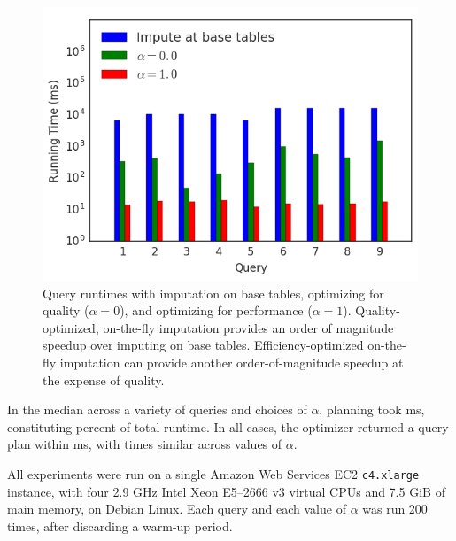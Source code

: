 \begin{figure}
\includegraphics[width=\columnwidth]{figures/running_times_combined_bar.png}
\caption{Query runtimes with imputation on base tables, \ProjectName{}
    optimizing for quality ($\alpha=0$), and \ProjectName{} optimizing for
    performance ($\alpha=1$). Quality-optimized, on-the-fly imputation provides an order of
    magnitude speedup over imputing on base tables. Efficiency-optimized on-the-fly
    imputation can provide another order-of-magnitude speedup at the expense of quality.}
    
\label{fig:runtimes}
\end{figure}


In the median across a variety of queries and choices of $\alpha$, planning took
\planningmediantime{} ms, 
constituting \planningruntimepercent{} percent of total runtime. In all cases, the optimizer
returned a query plan within \planningmaxtime{} ms, with times similar across values of $\alpha$.

All experiments were run on a single Amazon Web Services EC2 {\tt c4.xlarge} instance, with
four 2.9 GHz Intel Xeon E5--2666 v3 virtual CPUs and 7.5 GiB of main memory, on Debian Linux.
Each query and each value of $\alpha$ was run 200 times, after discarding a warm-up period.



